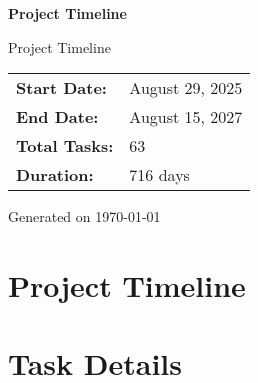 \documentclass[portrait,a4paper]{article}
\begin{document}
\begin{titlepage}
\centering
\vspace*{2cm}

{\Huge\textbf{Project Timeline}}

\vspace{1cm}

{\Large Project Timeline}

\vspace{2cm}

\begin{tabular}{ll}
\textbf{Start Date:} & August 29, 2025 \\
\textbf{End Date:} & August 15, 2027 \\
\textbf{Total Tasks:} & 63 \\
\textbf{Duration:} & 716 days \\
\end{tabular}

\vspace{2cm}

{\large Generated on \today}

\end{titlepage}

\newpage

\section*{Project Timeline}

\begin{center}
\begin{tikzpicture}[scale=0.8]
\end{tikzpicture}
\end{center}

\newpage

\section*{Task Details}
\end{document}

